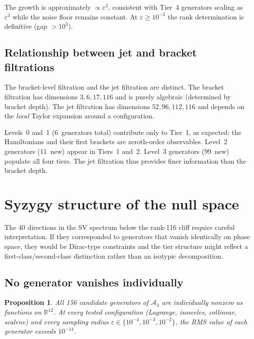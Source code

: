 \documentclass[11pt,a4paper]{article}
\newtheorem{proposition}[theorem]{Proposition}
\theoremstyle{remark}
\newcommand{\R}{\mathbb{R}}
\newcommand{\cA}{\mathcal{A}}
\begin{document}
The growth is approximately $\propto \varepsilon^2$,
consistent with Tier~4 generators scaling as
$\varepsilon^3$ while the noise floor remains constant.
At $\varepsilon \ge 10^{-3}$ the rank determination is
definitive (gap $> 10^3$).

\subsection{Relationship between jet and bracket filtrations}

The bracket-level filtration and the jet filtration are
distinct.  The bracket filtration has dimensions
$3, 6, 17, 116$ and is purely algebraic (determined by
bracket depth).  The jet filtration has dimensions
$52, 96, 112, 116$ and depends on the \emph{local}
Taylor expansion around a configuration.

Levels~0 and~1 (6~generators total) contribute only to
Tier~1, as expected: the Hamiltonians and their first
brackets are zeroth-order observables.  Level~2 generators
(11~new) appear in Tiers~1 and~2.  Level~3 generators
(99~new) populate all four tiers.  The jet filtration thus
provides finer information than the bracket depth.


\section{Syzygy structure of the null space}
\label{sec:syzygies}

The 40 directions in the SV spectrum below the rank-116
cliff require careful interpretation.  If they
corresponded to generators that vanish identically on
phase space, they would be Dirac-type constraints and the
tier structure might reflect a first-class/second-class
distinction rather than an isotypic decomposition.

\subsection{No generator vanishes individually}

\begin{proposition}
\label{prop:no-constraints}
All 156 candidate generators of $\cA_3$ are individually
nonzero as functions on $\R^{12}$.  At every tested
configuration (Lagrange, isosceles, collinear, scalene)
and every sampling radius
$\varepsilon \in \{10^{-4}, 10^{-3}, 10^{-2}\}$, the
RMS value of each generator exceeds $10^{-14}$.
\end{proposition}
\end{document}
